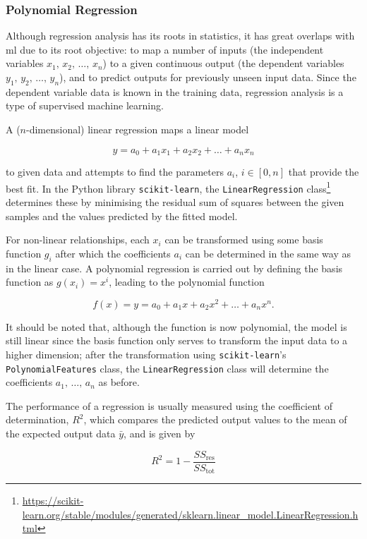 \subsubsection{Polynomial Regression} \label{sec:polyreg}
Although regression analysis has its roots in statistics, it has great overlaps with \ac{ml} due to its root objective: to map a number of inputs (the independent variables \(x_1,\,x_2,\,\ldots,\,x_n\)) to a given continuous output (the dependent variables \(y_1,\,y_2,\,\ldots,\,y_n\)), and to predict outputs for previously unseen input data. Since the dependent variable data is known in the training data, regression analysis is a type of supervised machine learning.

A (\(n\)-dimensional) linear regression maps a linear model

\[
    y = a_0 + a_1 x_1 + a_2 x_2 + \ldots + a_n x_n
\]

to given data and attempts to find the parameters \(a_i\), \(i \in \left[0, n\right]\) that provide the best fit. In the Python library \texttt{scikit-learn}, the \texttt{LinearRegression} class\footnote{\url{https://scikit-learn.org/stable/modules/generated/sklearn.linear_model.LinearRegression.html}} determines these by minimising the residual sum of squares between the given samples and the values predicted by the fitted model.

For non-linear relationships, each \(x_i\) can be transformed using some basis function \(g_i\) after which the coefficients \(a_i\) can be determined in the same way as in the linear case. A polynomial regression is carried out by defining the basis function as \(g(x_i) = x^i\), leading to the polynomial function

\[
    f(x) = y = a_0 + a_1 x + a_2 x^2 + \ldots + a_n x^n.
\]

It should be noted that, although the function is now polynomial, the model is still linear since the basis function only serves to transform the input data to a higher dimension; after the transformation using \texttt{scikit-learn}'s \texttt{PolynomialFeatures} class, the \texttt{LinearRegression} class will determine the coefficients \(a_1,\,\ldots,\,a_n\) as before.

The performance of a regression is usually measured using the coefficient of determination, \(R^2\), which compares the predicted output values to the mean of the expected output data \(\bar{y}\), and is given by

\[
    R^2 = 1 - \frac{SS_{\text{res}}}{SS_{\text{tot}}}
\]


